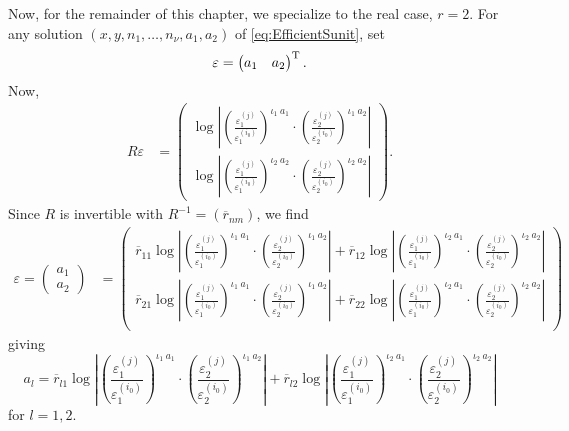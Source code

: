 Now, for the remainder of this chapter, we specialize to the real case, $r = 2$. For any solution $(x,y, n_1, \dots, n_{\nu}, a_1, a_2)$ of \eqref{eq:EfficientSunit}, set
\[\mathbf{\varepsilon} = \begin{pmatrix} a_1 & a_2 \end{pmatrix}^{\text{T}}.\]
Now, 
\begin{align*}
R{\varepsilon}
	& = \begin{pmatrix} 
		\log\left|\left(\frac{\varepsilon_1^{(j)}}{\varepsilon_1^{(i_0)}}\right)^{\iota_1 \ a_1} \cdot 
		 \left(\frac{\varepsilon_2^{(j)}}{\varepsilon_2^{(i_0)}}\right)^{\iota_1 \ a_2}\right| \\ 
		\log\left|\left(\frac{\varepsilon_1^{(j)}}{\varepsilon_1^{(i_0)}}\right)^{\iota_2\ a_2} \cdot 
		 \left(\frac{\varepsilon_2^{(j)}}{\varepsilon_2^{(i_0)}}\right)^{\iota_2 \ a_2}\right|
		 \end{pmatrix}.
\end{align*}
Since $R$ is invertible with $R^{-1} = (\overline{r}_{nm})$, we find
\begin{align*}
{\varepsilon} = \begin{pmatrix} a_1 \\ a_2 \end{pmatrix} 
	& = \begin{pmatrix} 
		\overline{r}_{11}\log\left|\left(\frac{\varepsilon_1^{(j)}}{\varepsilon_1^{(i_0)}}\right)^{\iota_1 \ a_1} 		\cdot \left(\frac{\varepsilon_2^{(j)}}{\varepsilon_2^{(i_0)}}\right)^{\iota_1 \ a_2}\right| + 
		\overline{r}_{12}\log\left|\left(\frac{\varepsilon_1^{(j)}}{\varepsilon_1^{(i_0)}}\right)^{\iota_2\ a_1}
		\cdot \left(\frac{\varepsilon_2^{(j)}}{\varepsilon_2^{(i_0)}}\right)^{\iota_2 \ a_2}\right| \\
		\overline{r}_{21}\log\left|\left(\frac{\varepsilon_1^{(j)}}{\varepsilon_1^{(i_0)}}\right)^{\iota_1 \ a_1} 		\cdot \left(\frac{\varepsilon_2^{(j)}}{\varepsilon_2^{(i_0)}}\right)^{\iota_1 \ a_2}\right| +
		\overline{r}_{22}\log\left|\left(\frac{\varepsilon_1^{(j)}}{\varepsilon_1^{(i_0)}}\right)^{\iota_2\ a_1}
		\cdot \left(\frac{\varepsilon_2^{(j)}}{\varepsilon_2^{(i_0)}}\right)^{\iota_2 \ a_2}\right| \\
		\end{pmatrix}
\end{align*}
giving
\[a_l = \overline{r}_{l1}\log\left|\left(\frac{\varepsilon_1^{(j)}}{\varepsilon_1^{(i_0)}}\right)^{\iota_1 \ a_1} 		\cdot \left(\frac{\varepsilon_2^{(j)}}{\varepsilon_2^{(i_0)}}\right)^{\iota_1 \ a_2}\right| + 
	\overline{r}_{l2}\log\left|\left(\frac{\varepsilon_1^{(j)}}{\varepsilon_1^{(i_0)}}\right)^{\iota_2\ a_1}
	\cdot \left(\frac{\varepsilon_2^{(j)}}{\varepsilon_2^{(i_0)}}\right)^{\iota_2 \ a_2}\right|\]
for $l = 1,2$. 

